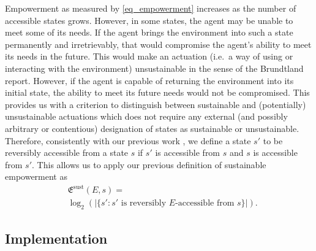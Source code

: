 \documentclass[conference]{IEEEtran}
\newcommand{\agentimpact}{\ensuremath{e}}
\newcommand{\empowerment}{\ensuremath{\mathfrak{E}}}
\newcommand{\sustainableempowerment}{\ensuremath{\empowerment^{\mathrm{sust}}}}
\newcommand{\impactstrength}{\ensuremath{E}}
\begin{document}


Empowerment as measured by \eqref{eq_empowerment} increases as the
number of accessible states grows. However, in some states, the agent
may be unable to meet some of its needs. If the agent brings the
environment into such a state permanently and irretrievably, that
would compromise the agent's ability to meet its needs in the future.
This would make an actuation (i.e.\ a way of using or interacting with
the environment) unsustainable in the sense of the Brundtland
report. However, if the agent is capable of returning the
environment into its initial state, the ability to meet its future
needs would not be compromised. This provides us with a criterion to
distinguish between sustainable and (potentially) unsustainable
actuations which does not require any external (and possibly arbitrary
or contentious) designation of states as sustainable or unsustainable.
Therefore, consistently with our previous work
\cite{Kim2009_sustainability}, we define a state $s'$ to be reversibly
accessible from a state $s$ if $s'$ is accessible from $s$ and $s$ is
accessible from $s'$. This allows us to apply our previous definition
of sustainable empowerment as
\begin{equation}
  \label{eq_sustainableempowerment}
  \begin{aligned}
    & \sustainableempowerment(E, s) = \\
    & \log_2(|\{s': s' \mbox{ is
      reversibly } E\mbox{-accessible from } s\}|).
  \end{aligned}
\end{equation}


\subsection{Implementation}
\end{document}
